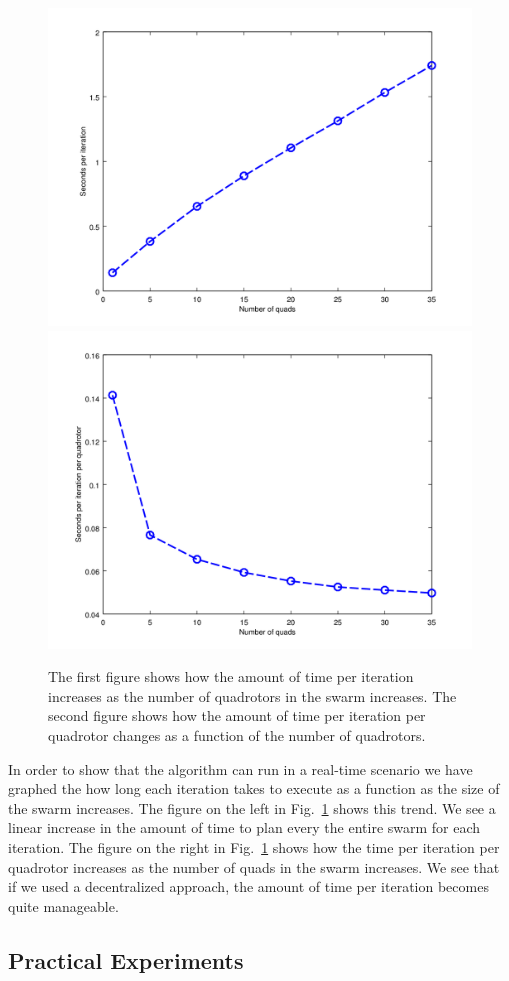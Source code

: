 \documentclass{article}
\begin{document}
\begin{figure}[h!]

    \centering
    \includegraphics[width=0.49\columnwidth]{tasefigs/comp_eff.png}
    \includegraphics[width=0.49\columnwidth]{tasefigs/comp_eff_per_quad.png}

    \caption{The first figure shows how the amount of time per iteration
    increases as the number of quadrotors in the swarm increases. The
    second figure shows how the amount of time per iteration per quadrotor
    changes as a function of the number of quadrotors.}

    \label{fig:comp_eff}

\end{figure}

In order to show that the algorithm can run in a real-time scenario we have
graphed the how long each iteration takes to execute as a function as the size
of the swarm increases. The figure on the left in Fig.~\ref{fig:comp_eff} shows
this trend.  We see a linear increase in the amount of time to plan every the
entire swarm for each iteration. The figure on the right in
Fig.~\ref{fig:comp_eff} shows how the time per iteration per quadrotor
increases as the number of quads in the swarm increases. We see that if we used
a decentralized approach, the amount of time per iteration becomes quite
manageable.

\subsection{Practical Experiments}
\end{document}
